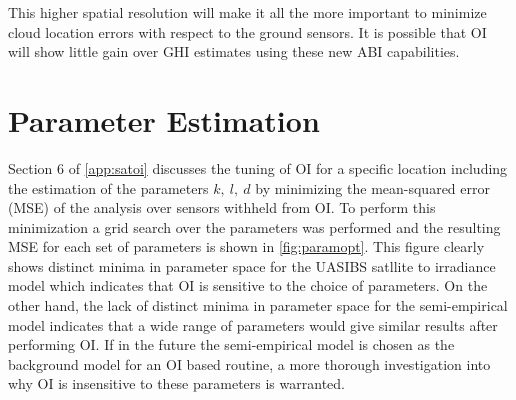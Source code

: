 This higher spatial resolution will make it all the more important
to minimize cloud location errors with respect to the ground sensors.
It is possible that OI will show little gain over GHI estimates using
these new ABI capabilities.

\section{Parameter Estimation}
\label{sec:paramopt}

Section 6 of \cref{app:satoi} discusses the tuning of OI for a
specific location including the estimation of the parameters $k,\:
l,\: d$ by minimizing the mean-squared error (MSE) of the analysis
over sensors withheld from OI.
To perform this minimization a grid search over the parameters was
performed and the resulting MSE for each set of parameters is shown in
\cref{fig:paramopt}.
This figure clearly shows distinct minima in parameter space for the
UASIBS satllite to irradiance model which indicates that  OI is
sensitive to the choice of parameters.
On the other hand, the lack of distinct minima in parameter space for
the semi-empirical model indicates that a wide range of parameters would
give similar results after performing OI.
If in the future the semi-empirical model is chosen as the background model
for an OI based routine, a more thorough investigation into why OI is
insensitive to these parameters is warranted.

